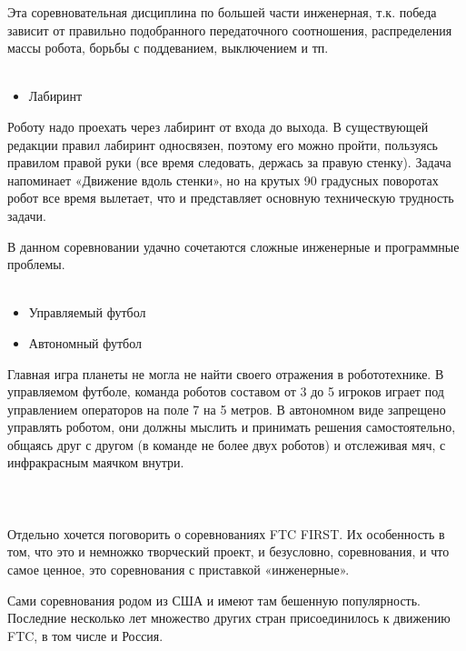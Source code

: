 Эта соревновательная дисциплина по большей части инженерная, т.к. победа зависит от правильно подобранного передаточного соотношения, распределения массы робота, борьбы с поддеванием, выключением и тп.\\\\

\begin{itemize}
	\item Лабиринт
\end{itemize}

Роботу надо проехать через лабиринт от входа до выхода. В существующей редакции правил лабиринт односвязен, поэтому его можно пройти, пользуясь правилом правой руки (все время следовать, держась за правую стенку). Задача напоминает «Движение вдоль стенки», но на крутых 90 градусных поворотах робот все время вылетает, что и представляет основную техническую трудность задачи. 

В данном соревновании удачно сочетаются сложные инженерные и программные проблемы.\\\\

\begin{itemize}
	\item Управляемый футбол
	\item Автономный футбол
\end{itemize}

Главная игра планеты не могла не найти своего отражения в робототехнике. В управляемом футболе, команда роботов составом от 3 до 5 игроков играет под управлением операторов на поле 7 на 5 метров. В автономном виде запрещено управлять роботом, они должны мыслить и принимать решения самостоятельно, общаясь друг с другом (в команде не более двух роботов) и отслеживая мяч, с инфракрасным маячком внутри.\\\\

{\hypertarget{lesson30x4}{}}\\\\

Отдельно хочется поговорить о соревнованиях FTC FIRST. Их особенность в том, что это и немножко творческий проект, и безусловно, соревнования, и что самое ценное, это соревнования с приставкой «инженерные». 

Сами соревнования родом из США и имеют там бешенную популярность. Последние несколько лет множество других стран присоединилось к движению FTC, в том числе и Россия.

